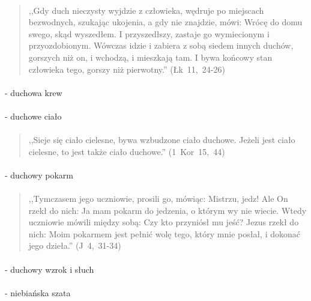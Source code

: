 \documentclass[10pt,a4paper,oneside]{article}
\begin{document}
\paragraph{}
\begin{quote}
,,Gdy duch nieczysty wyjdzie z człowieka, wędruje po miejscach bezwodnych, szukając ukojenia, a gdy nie znajdzie, mówi: Wrócę do domu swego, skąd wyszedłem. I przyszedłszy, zastaje go wymiecionym i przyozdobionym. Wówczas idzie i zabiera z sobą siedem innych duchów, gorszych niż on, i wchodzą, i mieszkają tam. I bywa końcowy stan człowieka tego, gorszy niż pierwotny.'' \mbox{(Łk 11, 24-26)}
\end{quote}
\paragraph{}
- duchowa krew
\paragraph{}
- duchowe ciało
\paragraph{}
\begin{quote}
,,Sieje się ciało cielesne, bywa wzbudzone ciało duchowe. Jeżeli jest ciało cielesne, to jest także ciało duchowe.'' \mbox{(1 Kor 15, 44)}
\end{quote}
\paragraph{}
- duchowy pokarm
\paragraph{}
\begin{quote}
,,Tymczasem jego uczniowie, prosili go, mówiąc: Mistrzu, jedz! Ale On rzekł do nich: Ja mam pokarm do jedzenia, o którym wy nie wiecie. Wtedy uczniowie mówili między sobą: Czy kto przyniósł mu jeść? Jezus rzekł do nich: Moim pokarmem jest pełnić wolę tego, który mnie posłał, i dokonać jego dzieła.'' \mbox{(J 4, 31-34)}
\end{quote}
\paragraph{}
- duchowy wzrok i słuch
\paragraph{}
- niebiańska szata
\end{document}
